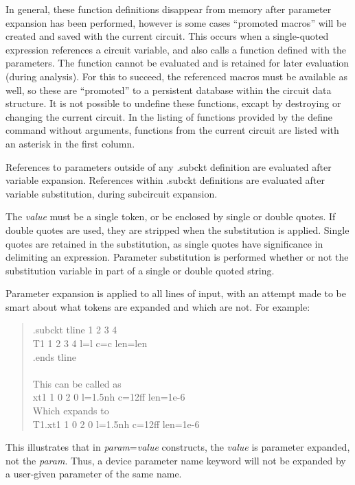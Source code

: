 In general, these function definitions disappear from memory after
parameter expansion has been performed, however is some cases
``promoted macros'' will be created and saved with the current
circuit.  This occurs when a single-quoted expression references a
circuit variable, and also calls a function defined with the
parameters.  The function cannot be evaluated and is retained for
later evaluation (during analysis).  For this to succeed, the
referenced macros must be available as well, so these are ``promoted''
to a persistent database within the circuit data structure.  It is not
possible to undefine these functions, excapt by destroying or changing
the current circuit.  In the listing of functions provided by the {\cb
define} command without arguments, functions from the current circuit
are listed with an asterisk in the first column.

References to parameters outside of any {\vt .subckt} definition are
evaluated after variable expansion.  References within {\vt .subckt}
definitions are evaluated after variable substitution, during
subcircuit expansion.

The {\it value} must be a single token, or be enclosed by single or
double quotes.  If double quotes are used, they are stripped when the
substitution is applied.  Single quotes are retained in the
substitution, as single quotes have significance in delimiting an
expression.  Parameter substitution is performed whether or not the
substitution variable in part of a single or double quoted string.

Parameter expansion is applied to all lines of input, with an 
attempt made to be smart about what tokens are expanded and which
are not.  For example:
\begin{quote}{\vt
.subckt tline 1 2 3 4\\
T1 1 2 3 4 l=l c=c len=len\\
.ends tline}\\\\
This can be called as\\
{\vt xt1 1 0 2 0 l=1.5nh c=12ff len=1e-6}\\
Which expands to\\
{\vt T1.xt1 1 0 2 0 l=1.5nh c=12ff len=1e-6}
\end{quote}

This illustrates that in {\it param\/}={\it value} constructs, the
{\it value} is parameter expanded, not the {\it param\/}.  Thus, a
device parameter name keyword will not be expanded by a user-given
parameter of the same name.

